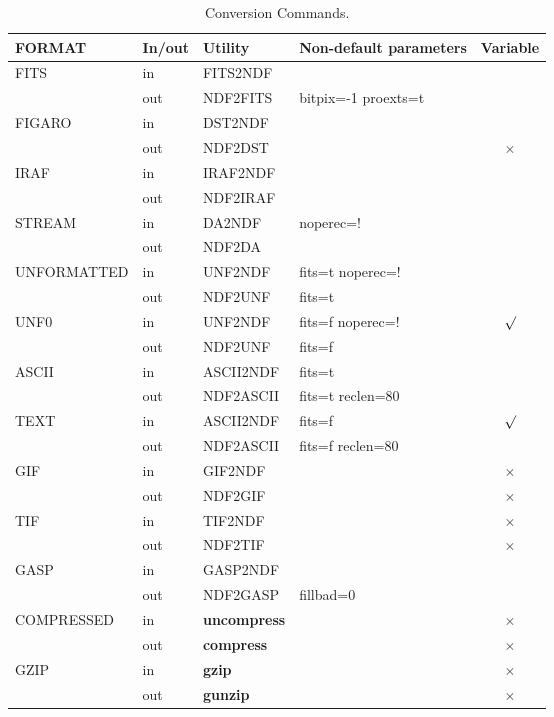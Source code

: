 \documentclass[twoside,11pt]{article}
\newcommand{\htmlref}[2]{#1}
\begin{document}
\begin{table}[ht]
\begin{center}
\begin{tabular}{|llllc|}
\hline
FORMAT & In/out & Utility & Non-default parameters & Variable \\
\hline
FITS & in & \htmlref{FITS2NDF}{FITS2NDF} & & \\
& out & \htmlref{NDF2FITS}{NDF2FITS} & bitpix=-1 proexts=t & \\
FIGARO & in & \htmlref{DST2NDF}{DST2NDF} & & \\
& out & \htmlref{NDF2DST}{NDF2DST} & & $\times$ \\
IRAF & in & \htmlref{IRAF2NDF}{IRAFNDF} & & \\
& out & \htmlref{NDF2IRAF}{NDF2IRAF} & & \\
STREAM & in & \htmlref{DA2NDF}{DA2NDF} & noperec=! & \\
& out & \htmlref{NDF2DA}{NDF2DA} & & \\
UNFORMATTED & in & \htmlref{UNF2NDF}{UNF2NDF} & fits=t noperec=! & \\
& out & \htmlref{NDF2UNF}{NDF2UNF} & fits=t & \\
UNF0 & in & \htmlref{UNF2NDF}{UNF2NDF} & fits=f noperec=! &  $\surd$ \\
& out & \htmlref{NDF2UNF}{NDF2UNF} & fits=f & \\
ASCII & in & \htmlref{ASCII2NDF}{ASCII2NDF} & fits=t & \\
& out & \htmlref{NDF2ASCII}{NDF2ASCII} & fits=t reclen=80 & \\
TEXT & in & \htmlref{ASCII2NDF}{ASCII2NDF} & fits=f &  $\surd$ \\
& out & \htmlref{NDF2ASCII}{ASCII2NDF} & fits=f reclen=80 & \\
GIF & in & \htmlref{GIF2NDF}{GIF2NDF} & & $\times$ \\
& out & \htmlref{NDF2GIF}{NDF2GIF} & & $\times$ \\
TIF & in & \htmlref{TIF2NDF}{TIF2NDF} & & $\times$ \\
& out & \htmlref{NDF2TIF}{NDF2TIF} & & $\times$ \\
GASP & in & \htmlref{GASP2NDF}{GASP2NDF} & & \\
& out & \htmlref{NDF2GASP}{NDF2GASP} & fillbad=0 & \\
COMPRESSED & in & {\bf uncompress} & & $\times$ \\
& out & {\bf compress} & & $\times$ \\
GZIP & in & {\bf gzip} & & $\times$ \\
& out & {\bf gunzip} & & $\times$ \\
\hline
\end{tabular}
\caption{\label{tab:conversions}Conversion Commands.}
\end{center}
\end{table}
\end{document}
